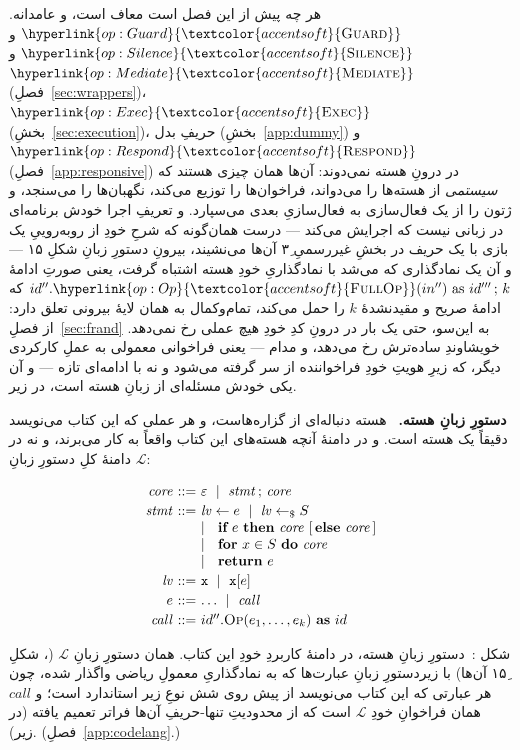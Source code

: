 \documentclass[10pt,oneside,openany]{book}
\newcounter{diagram}
\newcommand{\figcaption}[2]{%
  \par\smallskip
  \refstepcounter{diagram}\label{#1}%
  \parbox{0.92\textwidth}{\footnotesize
    \textcolor{accent}{شکل \thediagram:}\ #2\par}}
\newcommand{\op}[1]{\textnormal{\textsc{#1}}}
\newcommand{\opl}[1]{\hyperlink{op:#1}{\textcolor{accentsoft}{\op{#1}}}}
\newcommand{\fopl}[1]{\hyperlink{op:#1}{\textcolor{accentsoft}{\op{Full}\op{#1}}}}
\newcommand{\id}{id}
\newcommand{\V}[1]{\mathtt{#1}}
\newcommand{\Op}{\op{Op}}
\newcommand{\heading}[1]{\medskip\par\noindent\textcolor{accent}{\textbf{#1.}}\ }
\theoremstyle{accentdef}
\theoremstyle{accentplain}
\begin{document}
هر چه پیش از این فصل است معاف است، و عامدانه. $\opl{Guard}$ و
$\opl{Silence}$ و $\opl{Mediate}$ (فصلِ~\ref{sec:wrappers})،
$\opl{Exec}$ (بخشِ~\ref{sec:execution})، حریفِ بدل
(بخشِ~\ref{app:dummy}) و $\opl{Respond}$ (فصلِ~\ref{app:responsive}) در
درونِ هسته نمی‌دوند: آن‌ها همان چیزی هستند که \emph{سیستمی} از هسته‌ها را
می‌دواند، فراخوان‌ها را توزیع می‌کند، نگهبان‌ها را می‌سنجد، و ژتون را از یک
فعال‌سازی به فعال‌سازیِ بعدی می‌سپارد. و تعریفِ اجرا خودش برنامه‌ای در زبانی
نیست که اجرایش می‌کند --- درست همان‌گونه که شرحِ خودِ \cite{BR06} از
روبه‌روییِ یک بازی با یک حریف در بخشِ غیررسمیِ ۳ِ آن‌ها می‌نشیند، بیرونِ
دستورِ زبانِ شکلِ ۱۵ --- و آن یک نمادگذاری که می‌شد با نمادگذاریِ خودِ هسته
اشتباه گرفت، یعنی صورتِ ادامهٔ $\id''.\fopl{Op}(in'')\ \text{as}\
\id'''\,;\,k$ که ادامهٔ صریح و مقیدنشدهٔ $k$ را حمل می‌کند، تمام‌وکمال به
همان لایهٔ بیرونی تعلق دارد: از فصلِ~\ref{sec:frand} به این‌سو، حتی یک بار
در درونِ کدِ خودِ هیچ عملی رخ نمی‌دهد. خویشاوندِ ساده‌ترش رخ می‌دهد، و
مدام --- یعنی فراخوانی معمولی به عملِ کارکردی دیگر، که زیرِ هویتِ خودِ
فراخواننده از سر گرفته می‌شود و نه با ادامه‌ای تازه --- و آن یکی خودش
مسئله‌ای از زبانِ هسته است، در زیر.

\heading{دستورِ زبانِ هسته} هسته دنباله‌ای از گزاره‌هاست، و هر عملی که این
کتاب می‌نویسد دقیقاً یک هسته است. و در دامنهٔ آنچه هسته‌های این کتاب واقعاً
به کار می‌برند، و نه در دامنهٔ کلِ دستورِ زبانِ $\mathcal{L}$:

\begin{center}
\footnotesize
\[
\begin{array}{r@{\ }c@{\ }l}
\mathit{core} & ::= & \varepsilon \ \mid\ \mathit{stmt} \,;\, \mathit{core} \\[2pt]
\mathit{stmt} & ::= & \mathit{lv} \gets e
                  \ \mid\ \mathit{lv} \gets_{\$} S \\
              &     & \mid\ \ \textbf{if}\ e\ \textbf{then}\ \mathit{core}\ [\,\textbf{else}\ \mathit{core}\,] \\
              &     & \mid\ \ \textbf{for}\ x \in S\ \textbf{do}\ \mathit{core} \\
              &     & \mid\ \ \textbf{return}\ e \\[2pt]
\mathit{lv}   & ::= & \V{x} \ \mid\ \V{x}[e] \\[2pt]
e             & ::= & \dots \ \mid\ \mathit{call} \\[2pt]
\mathit{call} & ::= & \id''.\Op(e_1,\ldots,e_k)\ \textbf{as}\ \id
\end{array}
\]
\figcaption{fig:codelang}{دستورِ زبانِ هسته، در دامنهٔ کاربردِ خودِ این کتاب. همان دستورِ زبانِ $\mathcal{L}$ (\cite{BR06}، شکلِ ۱۵ِ آن‌ها) با زیردستورِ زبانِ عبارت‌ها که به نمادگذاریِ معمولِ ریاضی واگذار شده، چون هر عبارتی که این کتاب می‌نویسد از پیش روی شش نوعِ زیر استاندارد است؛ و $\mathit{call}$ همان فراخوانِ خودِ $\mathcal{L}$ است که از محدودیتِ تنها-حریفِ آن‌ها فراتر تعمیم یافته (در زیر). (فصلِ~\ref{app:codelang}.)}
\end{center}
\end{document}
